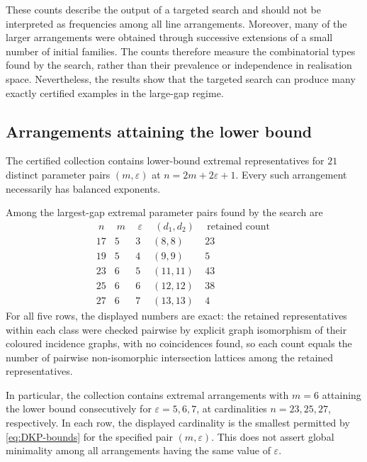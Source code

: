 \documentclass[pdflatex,sn-mathphys-num]{sn-jnl}%
\renewcommand{\epsilon}{\varepsilon}
\theoremstyle{remark}
\theoremstyle{definition}
\begin{document}
These counts describe the output of a targeted search and should not be interpreted as frequencies among all line arrangements. Moreover, many of the larger arrangements were obtained through successive extensions of a small number of initial families. The counts therefore measure the combinatorial types found by the search, rather than their prevalence or independence in realisation space. Nevertheless, the results show that the targeted search can produce many exactly certified examples in the large-gap regime.

\subsection{Arrangements attaining the lower bound}

The certified collection contains lower-bound extremal representatives for $21$ distinct parameter pairs $(m,\epsilon)$ at $n=2m+2\epsilon+1$. Every such arrangement necessarily has balanced exponents. 

Among the largest-gap extremal parameter pairs found by the search are
\[
\begin{array}{c|c|c|c|r}
~n~&~m~&~\epsilon~&~(d_1,d_2)~&~\text{retained count}~\\
\hline
17&5&3&(8,8)&23\\
19&5&4&(9,9)&5\\
23&6&5&(11,11)&43\\
25&6&6&(12,12)&38\\
27&6&7&(13,13)&4
\end{array}
\]
For all five rows, the displayed numbers are exact: the retained representatives within each class were checked pairwise by explicit graph isomorphism of their coloured incidence graphs, with no coincidences found, so each count equals the number of pairwise non-isomorphic intersection lattices among the retained representatives.

In particular, the collection contains extremal arrangements with $m=6$ attaining the lower bound consecutively for $\epsilon=5,6,7$, at cardinalities $n=23,25,27$, respectively. In each row, the displayed cardinality is the smallest permitted by \eqref{eq:DKP-bounds} for the specified pair $(m,\epsilon)$. This does not assert global minimality among all arrangements having the
same value of $\epsilon$.
\end{document}
